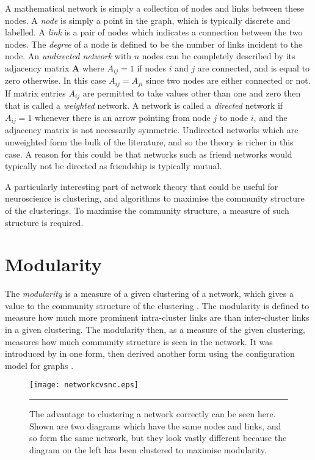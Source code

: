 A mathematical network is simply a collection of nodes and links between
these nodes.  A \emph{node} is simply a point in the graph, which is typically discrete and labelled. A \emph{link} is a pair of nodes which indicates a connection between the two nodes.  The \emph{degree} of a node is defined to be the number of links incident to the node.  An \emph{undirected network} with $n$ nodes can be
completely described by its adjacency matrix $\mathbf{A}$ where $A_{ij} =
1$ if nodes $i$ and $j$ are connected, and is equal to zero otherwise. In this 
case $A_{ij} = A_{ji}$ since two nodes are either connected or
not.  If matrix entries $A_{ij}$ are permitted to take values other than one and zero
then that is called a \emph{weighted} network. A network is called a \emph{directed} network if $A_{ij} = 1$ whenever there 
is an arrow pointing from node $j$ to node $i$, and the adjacency matrix is not  necessarily symmetric.   Undirected networks which are unweighted form the bulk of the literature, and so the theory is richer
in this case. A reason for this could be that networks such as friend networks \citep{Zachary1977a} would typically not be directed as friendship is typically mutual.

A particularly interesting part of network theory that could be useful for
neuroscience is clustering, and algorithms to maximise the community structure of the clusterings. To maximise the community structure, a measure of such structure is required.

\section{Modularity}

The \emph{modularity} is a measure of a given clustering of a network, which gives a value to the community structure of the clustering \citep{NewmanGirvan2004a}. The modularity is defined to measure how much more prominent
intra-cluster links are than inter-cluster links in a given
clustering. The modularity then, as a measure of the given clustering, measures how much community structure is seen in the network.  It was introduced by \citet{NewmanGirvan2004a} in one form, then \citet{Newman2006b, Newman2006a} derived another form using the configuration model for graphs \citep{BenderCanfield1978a,Bollobas1980a}.


\begin{figure}[htb]
  \centering
  \texttt{[image: networkcvsnc.eps]}
  \bigskip
  \rule{31.5em}{0.5pt}
  \caption{The advantage to clustering a network correctly can be seen here.  Shown  
    are two diagrams which have the same nodes and links, and so form the same 
    network, but they look vastly different because the diagram on the left 
    has been clustered to maximise modularity.}
  \label{netclus}
\end{figure}

